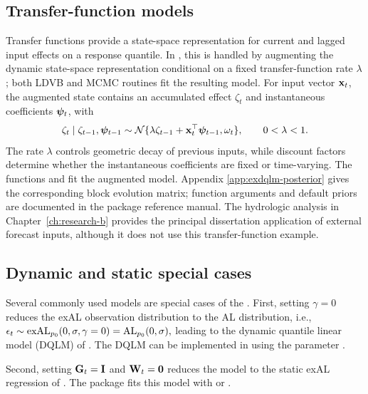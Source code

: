
\subsection{Transfer-function models}
\label{exd:sec:tf}

Transfer functions provide a state-space representation for current and lagged input effects on a response quantile.
In , this is handled by augmenting the dynamic state-space representation conditional on a fixed transfer-function rate \(\lambda\); both LDVB and MCMC routines fit the resulting model.
For input vector \(\mathbf{x}_t\), the augmented state contains an accumulated
effect \(\zeta_t\) and instantaneous coefficients \(\boldsymbol{\psi}_t\), with
\[
\zeta_t\mid\zeta_{t-1},\boldsymbol{\psi}_{t-1}
\sim\mathcal{N}\{\lambda\zeta_{t-1}+\mathbf{x}_t^\top\boldsymbol{\psi}_{t-1},\omega_t\},
\qquad 0<\lambda<1.
\]
The rate \(\lambda\) controls geometric decay of previous inputs, while
discount factors determine whether the instantaneous coefficients are fixed or
time-varying. The functions  and
 fit the augmented model. Appendix
\ref{app:exdqlm-posterior} gives the corresponding block evolution matrix;
function arguments and default priors are documented in the package reference
manual. The hydrologic analysis in Chapter~\ref{ch:research-b} provides the
principal dissertation application of external forecast inputs, although it
does not use this transfer-function example.


\subsection{Dynamic and static special cases}
\label{exd:sec:special}

Several commonly used models are special cases of the . First, setting $\gamma=0$ reduces the exAL observation distribution to the AL distribution, i.e.,
$\epsilon_t \sim \operatorname{exAL}_{p_0}(0,\sigma,\gamma=0) = \operatorname{AL}_{p_0}(0,\sigma),$ leading to the dynamic quantile linear model (DQLM) of \cite{exd-gonccalves2017dynamic}. The DQLM can be implemented in  using the parameter .

Second, setting $\mathbf{G}_t=\mathbf{I}$ and $\mathbf{W}_t=\mathbf{0}$ reduces the model to the static exAL regression of \cite{exd-yan2025family}.
The package fits this model with  or
.

